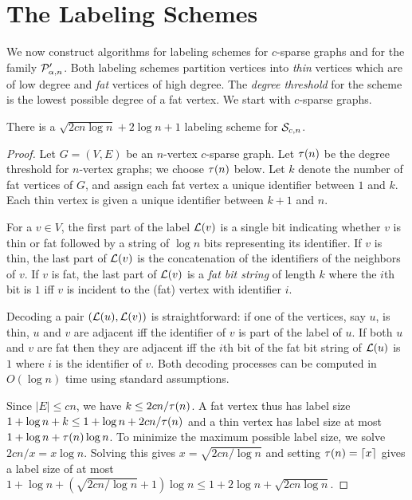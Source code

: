 
\section{The Labeling Schemes}
\label{sec:lab_schem}
We now construct algorithms for labeling schemes for $c$-sparse graphs and for the family $ \mathcal{P}'_{\alpha,n}$. Both labeling schemes partition vertices into \emph{thin} vertices which are of low degree and \emph{fat} vertices of high degree. The \emph{degree threshold} for the scheme is the lowest possible degree of a fat vertex. We start with $c$-sparse graphs.
\begin{theorem}\label{sparse-label}
There is a $\sqrt{2cn\log n} + 2\log n + 1$ labeling scheme for $ \mathcal{S}_{c,n}$.
\end{theorem}
\begin{proof}
Let $G=(V,E)$ be an $n$-vertex $c$-sparse graph. Let $\tau(n)$ be the degree threshold for $n$-vertex graphs; we choose $\tau(n)$ below. Let $k$ denote the number of fat vertices of $G$, and assign each fat vertex a unique identifier between $1$ and $k$. Each thin vertex is given a unique identifier between $k+1$ and $n$.

For a $v\in V$, the first part of the label $ \mathcal{L}(v)$ is a single bit indicating whether $v$ is thin or fat followed by a string of $\log n$ bits representing its identifier. If $v$ is thin, the last part of $ \mathcal{L}(v)$ is the concatenation of the identifiers of the neighbors of $v$. If $v$ is fat, the last part of $ \mathcal{L}(v)$ is a \emph{fat bit string} of length $k$ where the $i$th bit is $1$ iff $v$ is incident to the (fat) vertex with identifier $i$.

Decoding a pair $( \mathcal{L}(u), \mathcal{L}(v))$ is straightforward: if one of the vertices, say $u$, is thin, $u$ and $v$ are adjacent iff the identifier of $v$ is part of the label of $u$. If both $u$ and $v$ are fat then they are adjacent iff the $i$th bit of the fat bit string of $ \mathcal{L}(u)$ is $1$ where $i$ is the identifier of $v$.
Both decoding processes can be computed in $O(\log n)$ time using standard assumptions.

Since $|E|\leq cn$, we have $k\leq 2cn/\tau(n)$. A fat vertex thus has label size $1 + \log n + k\leq 1 + \log n + 2cn/\tau(n)$ and a thin vertex has label size at most $1 + \log n + \tau(n)\log n$. To minimize the maximum possible label size, we solve $2cn/x = x\log n$. Solving this gives $x = \sqrt{2cn/\log n}$ and setting $\tau(n) = \lceil x\rceil$ gives a label size of at most $1 + \log n + (\sqrt{2cn/\log n} + 1)\log n\leq 1 + 2\log n + \sqrt{2cn\log n}$.
\end{proof}

